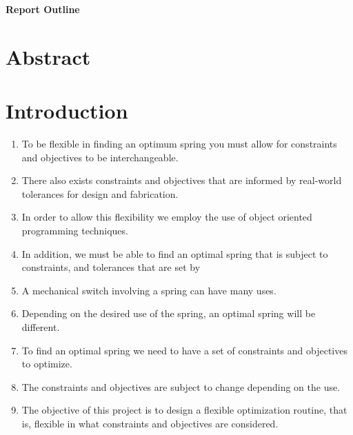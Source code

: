 \documentclass[11pt]{article}
\begin{document}
\begin{center}{\Large{\textbf{Report Outline}}}
\end{center}


\vspace{.2in}

\section{Abstract}


	
\section{Introduction}
	\begin{enumerate}

		\item To be flexible in finding an optimum spring you must allow for constraints and objectives to be interchangeable.
				
		\item There also exists constraints and objectives that are informed by real-world tolerances for design and fabrication. 
	
		\item In order to allow this flexibility we employ the use of object oriented programming techniques. 
		
		\item In addition, we must be able to find an optimal spring that is subject to constraints, and tolerances that are set by 
		
		\item A mechanical switch involving a spring can have many uses. 
		
		\item Depending on the desired use of the spring, an optimal spring will be different. 
	
		\item To find an optimal spring we need to have a set of constraints and objectives to optimize. 
		
		\item The constraints and objectives are subject to change depending on the use. 
		
		\item The objective of this project is to design a flexible optimization routine, that is, flexible in what constraints and objectives are considered. 
		
	\end{enumerate}
	
\end{document}
